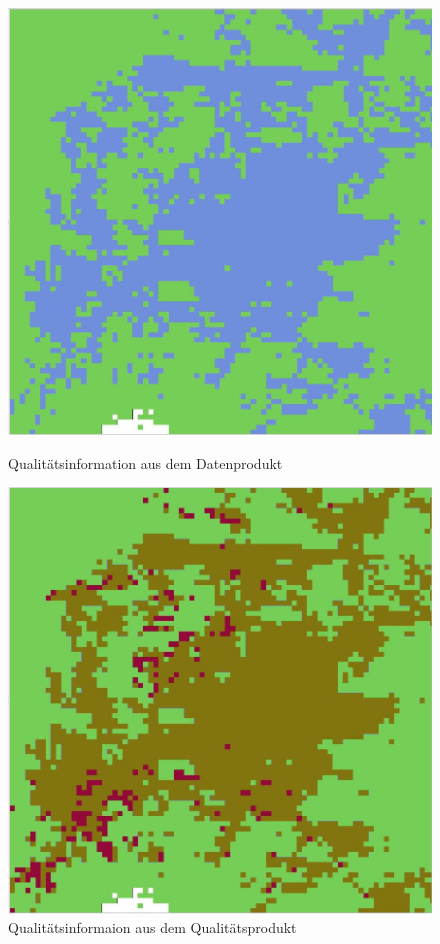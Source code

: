 \documentclass[11pt]{report}
\begin{document}
\begin{figure}[H]
   \begin{minipage}[b]{.4\linewidth} %
      \includegraphics[width=\linewidth]{./Grafiken/Datenakquisition/Quali_verleich_MCD43A4.JPG}
      \caption{Qualitätsinformation aus dem Datenprodukt}
   \end{minipage}
   \hspace{.1\linewidth}%
   \begin{minipage}[b]{.4\linewidth} %
      \includegraphics[width=\linewidth]{./Grafiken/Datenakquisition/Quali_verleich_MCD43A2.JPG}
      \caption{Qualitätsinformaion aus dem Qualitätsprodukt}
   \end{minipage}
\end{figure}
\end{document}
